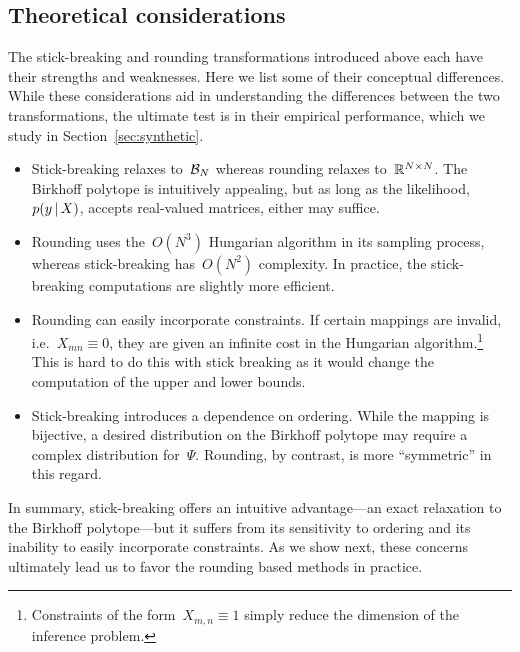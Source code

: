 \documentclass[twoside]{article}
\begin{document}
\subsection{Theoretical considerations}
\label{sec:considerations}

The stick-breaking and rounding transformations introduced above each
have their strengths and weaknesses.  Here we list some of their
conceptual differences.  While these considerations aid in
understanding the differences between the two transformations, the
ultimate test is in their empirical performance, which we study in
Section~\ref{sec:synthetic}.

\begin{itemize}
\item Stick-breaking relaxes to~$\mathcal{B}_N$ whereas rounding relaxes
  to~$\mathbb{R}^{N \times N}$. The Birkhoff polytope is
  intuitively appealing, but as long as the likelihood,~$p(y \, | \, X)$,
  accepts real-valued matrices, either may suffice. 
  
\item Rounding uses the~$O(N^3)$ Hungarian algorithm in its sampling
  process, whereas stick-breaking has~$O(N^2)$ complexity. In practice,
  the stick-breaking computations are slightly more efficient.
    
\item Rounding can easily incorporate constraints.  If certain
  mappings are invalid, i.e.~${X_{mn} \equiv 0}$, they are given an
  infinite cost in the Hungarian algorithm.\footnote{Constraints of
    the form~$X_{m,n} \equiv 1$ simply reduce the dimension of the
    inference problem.}  This is hard to do this with stick breaking
  as it would change the computation of the upper and lower bounds. 
  
\item Stick-breaking introduces a dependence on ordering.  While the
  mapping is bijective, a desired distribution on the Birkhoff polytope
  may require a complex distribution for~$\Psi$.  Rounding, by contrast,
  is more ``symmetric'' in this regard.
  
\end{itemize}

In summary, stick-breaking offers an intuitive advantage---an exact
relaxation to the Birkhoff polytope---but it suffers from its
sensitivity to ordering and its inability to easily incorporate
constraints.  As we show next, these concerns ultimately lead us to
favor the rounding based methods in practice.
\end{document}
